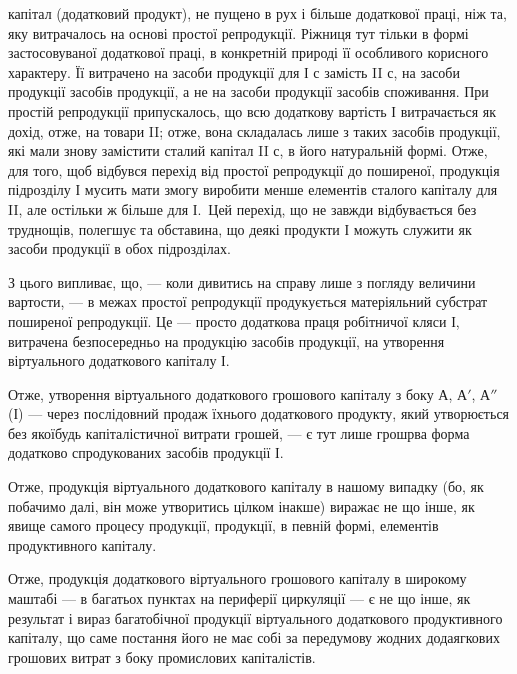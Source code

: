 \parcont{}  %
капітал (додатковий продукт), не пущено в рух і більше додаткової праці,
ніж та, яку витрачалось на основі простої репродукції. Ріжниця тут
тільки в формі застосовуваної додаткової праці, в конкретній природі її
особливого корисного характеру. Її витрачено на засоби продукції для
І $с$ замість II $с$, на засоби продукції засобів продукції, а не на засоби
продукції засобів споживання. При простій репродукції припускалось,
що всю додаткову вартість І витрачається як дохід, отже, на товари II;
отже, вона складалась лише з таких засобів продукції, які мали знову
замістити сталий капітал II $с$, в його натуральній формі. Отже, для того,
щоб відбувся перехід від простої репродукції до поширеної, продукція підрозділу
І мусить мати змогу виробити менше елементів сталого капіталу
для II, але остільки ж більше для І.~Цей перехід, що не завжди відбувається
без труднощів, полегшує та обставина, що деякі продукти І
можуть служити як засоби продукції в обох підрозділах.

З цього випливає, що, — коли дивитись на справу лише з погляду величини
вартости, — в межах простої репродукції продукується матеріяльний
субстрат поширеної репродукції. Це — просто додаткова праця робітничої
кляси І, витрачена безпосередньо на продукцію засобів продукції, на утворення
віртуального додаткового капіталу І.

Отже, утворення віртуального додаткового грошового капіталу з боку
$А$, $А'$, $А''$ (І) — через послідовний продаж їхнього додаткового продукту,
який утворюється без якоїбудь капіталістичної витрати грошей, — є тут
лише грошрва форма додатково спродукованих засобів продукції І.

Отже, продукція віртуального додаткового капіталу в нашому випадку
(бо, як побачимо далі, він може утворитись цілком інакше) виражає не
що інше, як явище самого процесу продукції, продукції, в певній формі,
елементів продуктивного капіталу.

Отже, продукція додаткового віртуального грошового капіталу в широкому
маштабі — в багатьох пунктах на периферії циркуляції — є не що
інше, як результат і вираз багатобічної продукції віртуального додаткового
продуктивного капіталу, що саме постання його не має собі за передумову
жодних додаягкових грошових витрат з боку промислових капіталістів.

